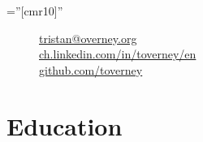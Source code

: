 \documentclass[a4paper,11pt]{article} %
\begin{document}
\pagestyle{empty} %

\font\fb=''[cmr10]'' %



\par{
\bigskip
\par
} %

\begin{figure}
\vspace{-3.5cm}
\footnotesize

\begin{flushright}

\href{mailto:tristan@overney.org}{tristan@overney.org} 
\hspace{0.1cm}
\faEnvelope{}
\\ 

\href{https://www.linkedin.com/in/toverney/en}{ch.linkedin.com/in/toverney/en}
\hspace{0.1cm}
\faLinkedin{}
\\

\href{https://github.com/toverney}{github.com/toverney}
\hspace{0.1cm} 
\faGithub{}
\\


\end{flushright}

\end{figure}


\section{Education}
\end{document}
